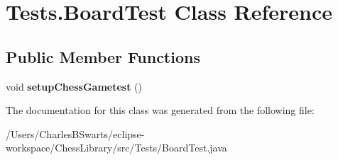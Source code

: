 \hypertarget{class_tests_1_1_board_test}{}\section{Tests.\+Board\+Test Class Reference}
\label{class_tests_1_1_board_test}
\subsection*{Public Member Functions}
\begin{DoxyCompactItemize}
\item 
\mbox{\label{class_tests_1_1_board_test_ab8064d4a263f1c5d09936f55d6d77dca}} 
void {\bfseries setup\+Chess\+Gametest} ()
\end{DoxyCompactItemize}


The documentation for this class was generated from the following file\+:\begin{DoxyCompactItemize}
\item 
/\+Users/\+Charles\+B\+Swarts/eclipse-\/workspace/\+Chess\+Library/src/\+Tests/Board\+Test.\+java\end{DoxyCompactItemize}
